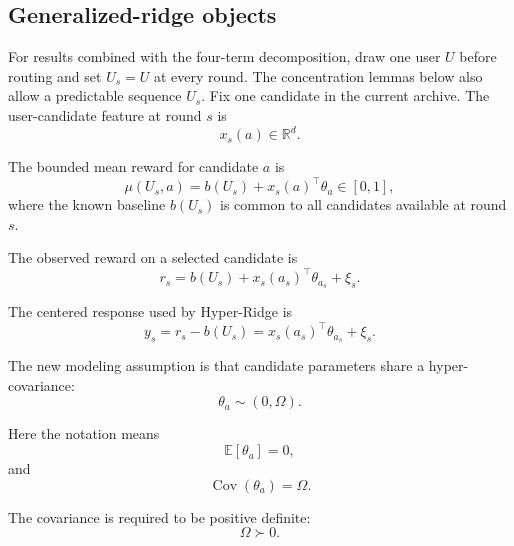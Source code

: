 \documentclass{article} %
\begin{document}
\subsection{Generalized-ridge objects}

For results combined with the four-term decomposition, draw one user \(U\)
before routing and set \(U_s=U\) at every round. The concentration lemmas below
also allow a predictable sequence \(U_s\). Fix one candidate in the current
archive. The user-candidate feature at round \(s\) is
\begin{equation}
\label{eq:hyper-feature}
x_s(a) \in \mathbb{R}^d .
\end{equation}

The bounded mean reward for candidate \(a\) is
\begin{equation}
\label{eq:hyper-linear-model-app}
\mu(U_s,a) = b(U_s)+x_s(a)^\top \theta_a\in[0,1],
\end{equation}
where the known baseline $b(U_s)$ is common to all candidates available at
round $s$.

The observed reward on a selected candidate is
\begin{equation}
\label{eq:hyper-reward}
r_s = b(U_s)+x_s(a_s)^\top \theta_{a_s} + \xi_s .
\end{equation}

The centered response used by Hyper-Ridge is
\begin{equation}
\label{eq:hyper-centered-reward}
y_s=r_s-b(U_s)=x_s(a_s)^\top\theta_{a_s}+\xi_s.
\end{equation}

The new modeling assumption is that candidate parameters share a hyper-covariance:
\begin{equation}
\label{eq:hyper-random-effects}
\theta_a \sim (0,\Omega).
\end{equation}

Here the notation means
\begin{equation}
\label{eq:hyper-random-effects-mean}
\mathbb{E}[\theta_a] = 0,
\end{equation}
and
\begin{equation}
\label{eq:hyper-random-effects-cov}
\operatorname{Cov}(\theta_a)=\Omega .
\end{equation}

The covariance is required to be positive definite:
\begin{equation}
\label{eq:hyper-omega-pd}
\Omega \succ 0 .
\end{equation}
\end{document}
